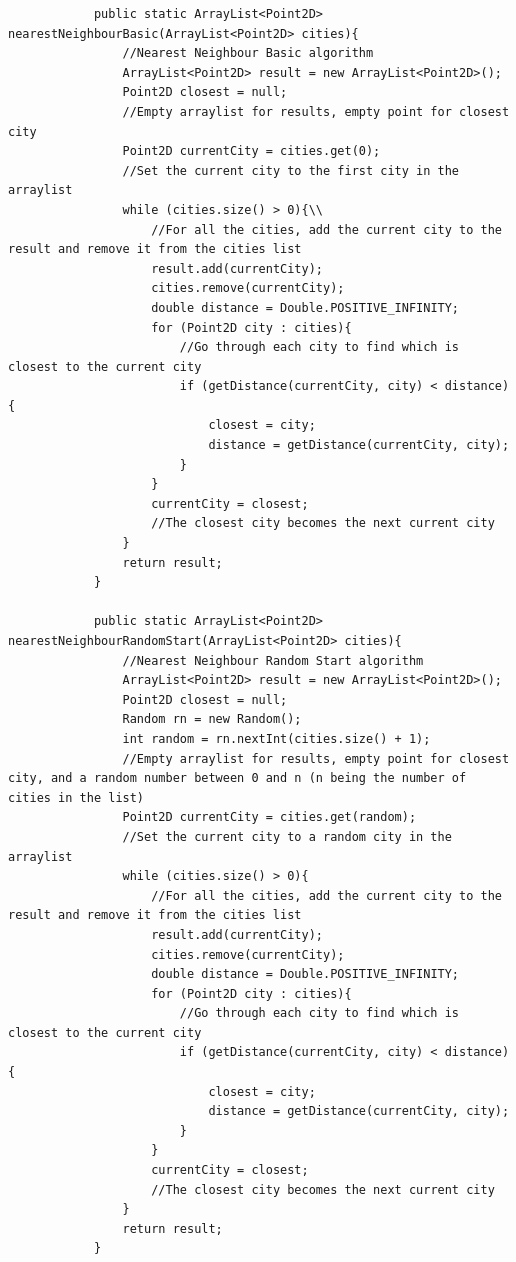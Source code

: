 \documentclass[conference,backref=page]{acmsiggraph}
\begin{document}
\begin{appendices}
\begin{lstlisting}
			public static ArrayList<Point2D> nearestNeighbourBasic(ArrayList<Point2D> cities){
				//Nearest Neighbour Basic algorithm
				ArrayList<Point2D> result = new ArrayList<Point2D>();
				Point2D closest = null;
				//Empty arraylist for results, empty point for closest city
				Point2D currentCity = cities.get(0);
				//Set the current city to the first city in the arraylist
				while (cities.size() > 0){\\
					//For all the cities, add the current city to the result and remove it from the cities list
					result.add(currentCity);
					cities.remove(currentCity);
					double distance = Double.POSITIVE_INFINITY;
					for (Point2D city : cities){
						//Go through each city to find which is closest to the current city
						if (getDistance(currentCity, city) < distance){
							closest = city;
							distance = getDistance(currentCity, city);
						}
					}
					currentCity = closest;
					//The closest city becomes the next current city
				}
				return result;
			}
			
			public static ArrayList<Point2D> nearestNeighbourRandomStart(ArrayList<Point2D> cities){
				//Nearest Neighbour Random Start algorithm
				ArrayList<Point2D> result = new ArrayList<Point2D>();
				Point2D closest = null;
				Random rn = new Random();
				int random = rn.nextInt(cities.size() + 1);
				//Empty arraylist for results, empty point for closest city, and a random number between 0 and n (n being the number of cities in the list)
				Point2D currentCity = cities.get(random);
				//Set the current city to a random city in the arraylist
				while (cities.size() > 0){
					//For all the cities, add the current city to the result and remove it from the cities list
					result.add(currentCity);
					cities.remove(currentCity);
					double distance = Double.POSITIVE_INFINITY;
					for (Point2D city : cities){
						//Go through each city to find which is closest to the current city
						if (getDistance(currentCity, city) < distance){
							closest = city;
							distance = getDistance(currentCity, city);
						}
					}
					currentCity = closest;
					//The closest city becomes the next current city
				}	
				return result;
			}
			

\end{lstlisting}
\end{appendices}
\end{document}

